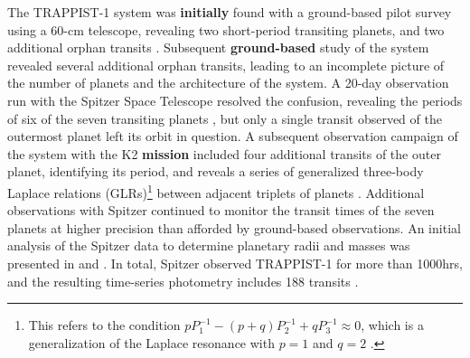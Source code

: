 \documentclass[twocolumn]{aastex63}
\begin{document}
The TRAPPIST-1 system was \textbf{initially} found with a ground-based pilot survey using a 60-cm telescope,
revealing two short-period transiting planets, and two additional orphan transits
\citep{Gillon2016, Burdanov2018}.  Subsequent \textbf{ground-based} study of the system revealed several
additional orphan transits, leading to an incomplete picture of the number of planets
and the architecture of the system.  A 20-day observation run with the Spitzer Space
Telescope \textbf{\citep{Werner2004}} resolved the
confusion, revealing the periods of six of the seven transiting planets \citep{Gillon2017},
but only a single transit observed of the outermost planet left its orbit in question.
A subsequent observation campaign of the system with the K2 \textbf{mission} included four
additional transits of the outer planet, identifying its period, and reveals a series
of generalized three-body Laplace relations (GLRs)\footnote{This refers to the condition
$pP_1^{-1}-(p+q)P_2^{-1}+qP_3^{-1} \approx 0$, which is a generalization of the Laplace
resonance with $p=1$ and $q=2$ \citep{Papaloizou2014}. } between adjacent triplets of
planets \citep{Luger2017a}.  Additional observations with Spitzer
continued to monitor the transit times of the seven planets at higher precision than
afforded by ground-based observations. An initial analysis of the Spitzer data to determine
planetary radii and masses was presented in \citet{Delrez2018a} and \citet{Grimm2018}. In total,
Spitzer observed TRAPPIST-1 for more than 1000hrs, and the resulting time-series photometry
includes 188 transits \citep{Ducrot2020}.
\end{document}
